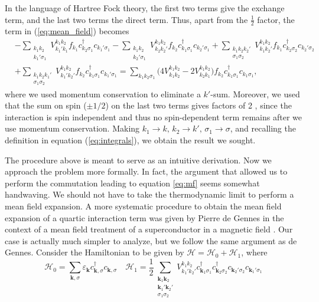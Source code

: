 In the language of Hartree Fock theory, the first two terms give the exchange term, and the last two terms the direct term. Thus, apart from the $\frac{1}{2}$ factor, the term in (\ref{eq:mean_field}) becomes
\begin{equation}
\begin{split}
&- \sum_{\substack{k_1 k_2 \\ k_1' \sigma_1}} V_{k_1' k_1}^{k_1 k_2} f_{k_1} c_{k_2 \sigma_1}^\dagger c_{k_1' \sigma_1}  - \sum_{\substack{k_1 k_2 \\ k_2' \sigma_1}} V_{k_2 k_2'}^{k_1 k_2} f_{k_2} c_{k_1 \sigma_1}^\dagger c_{k_2' \sigma_1} + \sum_{\substack{k_1 k_2 k_2' \\ \sigma_1 \sigma_2}} V_{k_1 k_2'}^{k_1 k_2} f_{k_1} c_{k_2 \sigma_2}^\dagger c_{k_2' \sigma_2} \\
& + \sum_{\substack{k_1 k_2 k_1' \\  \sigma_1 \sigma_2}} V_{k_1' k_2'}^{k_1 k_2} f_{k_2} c_{k_1 \sigma_1}^\dagger c_{k_1' \sigma_1} = \sum_{k_1 k_2 \sigma_1} \bigg( 4 V_{k_1 k_2}^{k_1 k_2} - 2  V_{k_2 k_1}^{k_1 k_2}  \bigg) f_{k_2} c_{k_1 \sigma_1}^\dagger c_{k_1 \sigma_1}
,
\end{split}
\end{equation}
where we used momentum conservation to eliminate a $k'$-sum. Moreover, we used that the sum on spin ($\pm 1/2$) on the last two terms gives factors of 2 , since the interaction is spin independent and thus no spin-dependent term remains after we use momentum conservation. Making $k_1 \rightarrow k , \, k_2 \rightarrow k', \, \sigma_1 \rightarrow \sigma$, and recalling the definition in equation (\ref{eq:integrals}), we obtain the result we sought.

The procedure above is meant to serve as an intuitive derivation. Now we approach the problem more formally. In fact, the argument that allowed us to perform the commutation leading to equation \ref{eq:mf} seems somewhat handwaving. We should not have to take the thermodynamic limit to perform a mean field expansion. A more systematic procedure to obtain the mean field expansion of a quartic interaction term was given by Pierre de Gennes in the context of a mean field treatment of a superconductor in a magnetic field \cite{gennes_superconductivity_1999}. Our case is actually much simpler to analyze, but we follow the same argument as de Gennes.
Consider the Hamiltonian to be given by $\mathcal{H} = \mathcal{H}_0 + \mathcal{H}_1$, where
\begin{equation}
\mathcal{H}_0 = \sum_{\bm k, \sigma} \varepsilon_{\bm k} c_{\bm k, \sigma}^\dagger c_{\bm k, \sigma} \quad 
\mathcal{H}_1 = \frac{1}{2} \sum_{\substack{\bm k_1 \bm k_2 \\ \bm k_1' \bm k_2' \\  \sigma_1 \sigma_2}} V_{k_1' k_2'}^{k_1 k_2} c_{\bm k_1 \sigma_1}^\dagger c_{\bm k_2 \sigma_2}^\dagger c_{\bm k_2' \sigma_2} c_{\bm k_1' \sigma_1} 
\end{equation}

